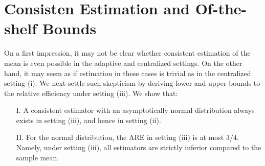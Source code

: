 \documentclass[letterpaper, 11pt]{IEEEtran}      %
\begin{document}
\section{ Consisten Estimation and Of-the-shelf Bounds \label{sec:preliminary}}
On a first impression, it may not be clear whether consistent estimation of the mean is even possible in the adaptive and centralized settings. On the other hand, it may seem as if estimation in these cases is trivial as in the centralized setting (i). 
%
We next settle such skepticism by deriving lower and upper bounds to the relative efficiency under setting (iii). We show that:
\begin{itemize}
\item[I.] A consistent estimator with an asymptotically normal distribution always exists in setting (iii), and hence in setting (ii). 
\item[II.] For the normal distribution, the ARE in setting (iii) is at most $3/4$. Namely, under setting (iii), all estimators are strictly inferior compared to the sample mean. 
\end{itemize}
\end{document}

